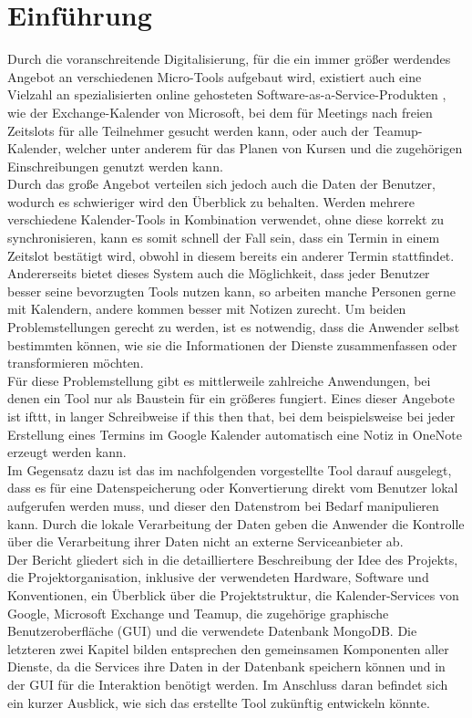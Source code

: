 \section{Einführung}
Durch die voranschreitende Digitalisierung, für die ein immer größer werdendes Angebot an verschiedenen Micro-Tools aufgebaut wird, existiert auch eine Vielzahl an spezialisierten online gehosteten Software-as-a-Service-Produkten \cite{Abolhassan.2016}, wie der Exchange-Kalender von Microsoft, bei dem für Meetings nach freien Zeitslots für alle Teilnehmer gesucht werden kann, oder auch der Teamup-Kalender, welcher unter anderem für das Planen von Kursen und die zugehörigen Einschreibungen genutzt werden kann. \\
Durch das große Angebot verteilen sich jedoch auch die Daten der Benutzer, wodurch es schwieriger wird den Überblick zu behalten. Werden mehrere verschiedene Kalender-Tools in Kombination verwendet, ohne diese korrekt zu synchronisieren, kann es somit schnell der Fall sein, dass ein Termin in einem Zeitslot bestätigt wird, obwohl in diesem bereits ein anderer Termin stattfindet. Andererseits bietet dieses System auch die Möglichkeit, dass jeder Benutzer besser seine bevorzugten Tools nutzen kann, so arbeiten manche Personen gerne mit Kalendern, andere kommen besser mit Notizen zurecht.
Um beiden Problemstellungen gerecht zu werden, ist es notwendig, dass die Anwender selbst bestimmten können, wie sie die Informationen der Dienste zusammenfassen oder transformieren möchten. \\
Für diese Problemstellung gibt es mittlerweile zahlreiche Anwendungen, bei denen ein Tool nur als Baustein für ein größeres fungiert. Eines dieser Angebote ist \glqq ifttt\grqq \cite{IFTTT}, in langer Schreibweise \glqq if this then that\grqq, bei dem beispielsweise bei jeder Erstellung eines Termins im Google Kalender automatisch eine Notiz in OneNote erzeugt werden kann. \\
Im Gegensatz dazu ist das im nachfolgenden vorgestellte Tool darauf ausgelegt, dass es für eine Datenspeicherung oder Konvertierung direkt vom Benutzer lokal aufgerufen werden muss, und dieser den Datenstrom bei Bedarf manipulieren kann. Durch die lokale Verarbeitung der Daten geben die Anwender die Kontrolle über die Verarbeitung ihrer Daten nicht an externe Serviceanbieter ab.\\
Der Bericht gliedert sich in die detailliertere Beschreibung der Idee des Projekts, die Projektorganisation, inklusive der verwendeten Hardware, Software und Konventionen, ein Überblick über die Projektstruktur, die Kalender-Services von Google, Microsoft Exchange und Teamup, die zugehörige graphische Benutzeroberfläche (GUI) und die verwendete Datenbank MongoDB. Die letzteren zwei Kapitel bilden entsprechen den gemeinsamen Komponenten aller Dienste, da die Services ihre Daten in der Datenbank speichern können und in der GUI für die Interaktion benötigt werden. Im Anschluss daran befindet sich ein kurzer Ausblick, wie sich das erstellte Tool zukünftig entwickeln könnte.
